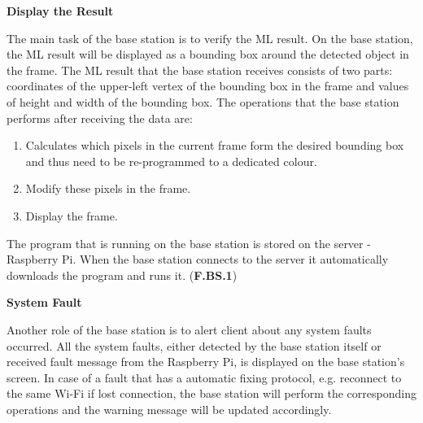 \textbf{Display the Result}

The main task of the base station is to verify the ML result. On the base station, the ML result will be displayed as a bounding box around the detected object in the frame. The ML result that the base station receives consists of two parts: coordinates of the upper-left vertex of the bounding box in the frame and values of height and width of the bounding box. The operations that the base station performs after receiving the data are:
\begin{enumerate}
    \item Calculates which pixels in the current frame form the desired bounding box and thus need to be re-programmed to a dedicated colour.
    \item Modify these pixels in the frame.
    \item Display the frame.
\end{enumerate}

The program that is running on the base station is stored on the server - Raspberry Pi. When the base station connects to the server it automatically downloads the program and runs it. (\textbf{F.BS.1})

\textbf{System Fault}

Another role of the base station is to alert client about any system faults occurred. All the system faults, either detected by the base station itself or received fault message from the Raspberry Pi, is displayed on the base station's screen. In case of a fault that has a automatic fixing protocol, e.g. reconnect to the same Wi-Fi if lost connection, the base station will perform the corresponding operations and the warning message will be updated accordingly.